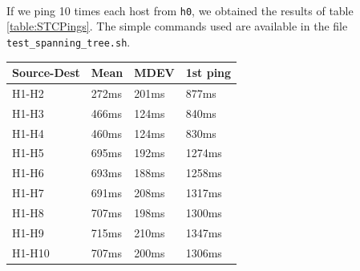 \documentclass[a4paper, 11pt, oneside]{article}
\begin{document}
\paragraph{}If we ping 10 times each host from \texttt{h0}, we obtained the results of table \ref{table:STCPings}. The simple commands used are available in the file \texttt{test\_spanning\_tree.sh}.\\
\begin{table}[H]
\centering
\begin{tabular}{|l|l|l|l|}
\hline
\multicolumn{1}{|c|}{\textbf{Source-Dest}} & \multicolumn{1}{c|}{\textbf{Mean}} & \multicolumn{1}{c|}{\textbf{MDEV}} & \multicolumn{1}{c|}{\textbf{1st ping}} \\ \hline
H1-H2                                      & 272ms                              & 201ms                              & 877ms                                 \\ \hline
H1-H3                                      & 466ms                              & 124ms                              & 840ms                                 \\ \hline
H1-H4                                      & 460ms                              & 124ms                              & 830ms                                 \\ \hline
H1-H5                                      & 695ms                              & 192ms                              & 1274ms                                 \\ \hline
H1-H6                                      & 693ms                              & 188ms                              & 1258ms                                 \\ \hline
H1-H7                                      & 691ms                              & 208ms                              & 1317ms                                 \\ \hline
H1-H8                                      & 707ms                              & 198ms                              & 1300ms                                 \\ \hline
H1-H9                                      & 715ms                              & 210ms                              & 1347ms                                 \\ \hline
H1-H10                                      & 707ms                              & 200ms                              & 1306ms                                 \\ \hline

\end{tabular}
\end{table}
\end{document}
